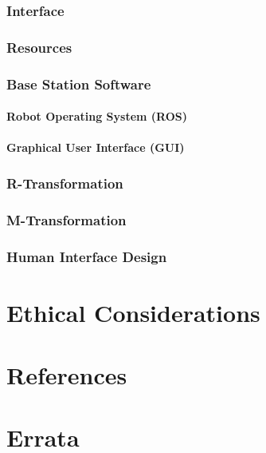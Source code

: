 \documentclass[english,12pt]{article}
\begin{document}
\subsubsection{Interface}
\subsubsection{Resources}
\subsubsection{Base Station Software}
\paragraph{Robot Operating System (ROS)}
\paragraph{Graphical User Interface (GUI)}
\subsubsection{R-Transformation}
\subsubsection{M-Transformation}
\subsubsection{Human Interface Design}
\section{Ethical Considerations}
\section{References}
\section{Errata}
\end{document}
